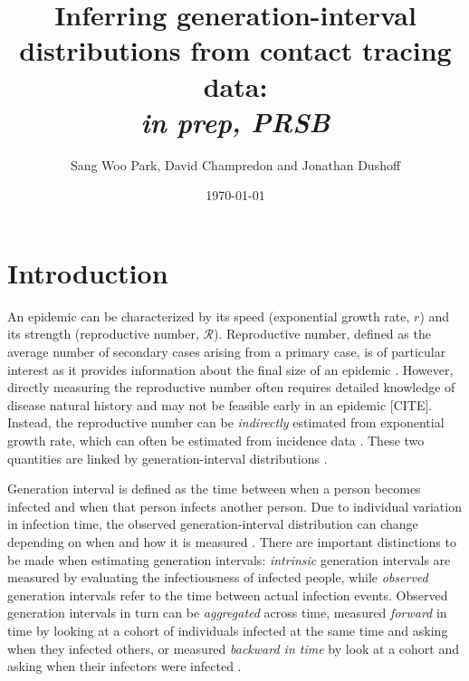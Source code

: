 \documentclass[12pt]{article}
\title{Inferring generation-interval distributions from contact tracing data: \\ \emph{in prep, PRSB}}
\author{Sang Woo Park, David Champredon and Jonathan Dushoff}
\date{\today}
\newcommand{\RR}{\ensuremath{{\mathcal R}}}
\begin{document}
\maketitle

\section{Introduction}

An epidemic can be characterized by its speed (exponential growth rate, $r$) and its strength (reproductive number, \RR).
Reproductive number, defined as the average number of secondary cases arising from a primary case, is of particular interest as it provides information about the final size of an epidemic \cite{anderson1991infectious, diekmann1990definition}.
However, directly measuring the reproductive number often requires detailed knowledge of disease natural history and may not be feasible early in an epidemic [CITE].
Instead, the reproductive number can be \emph{indirectly} estimated from exponential growth rate, which can often be estimated from incidence data \citep{mills2004transmissibility, nishiura2009transmission, ma2014estimating}.
These two quantities are linked by generation-interval distributions \citep{wallinga2007generation, park2019practical}.

Generation interval is defined as the time between when a person becomes infected and when that person infects another person.
Due to individual variation in infection time, the observed generation-interval distribution can change depending on when and how it is measured \citep{svensson2007note, kenah2008generation, nishiura2010time, champredon2015intrinsic}.
There are important distinctions to be made when estimating generation intervals: \emph{intrinsic} generation intervals are measured by evaluating the infectiousness of infected people,
while \emph{observed} generation intervals refer to the time between actual infection events.
Observed generation intervals in turn can be \emph{aggregated} across time, measured \emph{forward} in time by looking at a cohort of individuals infected at the same time and asking when they infected others, or measured \emph{backward in time} by look at a cohort and asking when their infectors were infected \citep{champredon2015intrinsic}.
\end{document}
